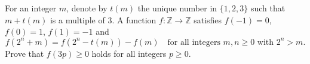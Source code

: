 For an integer $m$, denote by $t(m)$ the unique number in $\{1, 2, 3\}$ such that $m + t(m)$ is a multiple of $3$. A function $f : \mathbb{Z} \to \mathbb{Z}$ satisfies $f(-1) = 0$, $f(0) = 1$, $f(1) = -1$ and
\[
f(2^{n} + m) = f(2^{n} - t(m)) - f(m) \quad \text{for all integers } m, n \geq 0 \text{ with } 2^{n} > m.
\]
Prove that $f(3p) \geq 0$ holds for all integers $p \geq 0$.
